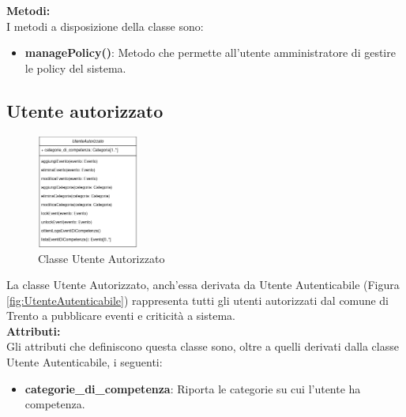 \textbf{Metodi:}\\
I metodi a disposizione della classe sono:

\begin{itemize}
    \item \textbf{managePolicy()}: Metodo che permette all'utente amministratore di gestire le policy del sistema.
\end{itemize}

\subsection{Utente autorizzato}

\begin{figure}[htbp]
    \centering
    \includegraphics[width=0.3\textwidth]{Images/UtenteAutorizzato-Class.png}
    \caption{Classe Utente Autorizzato}
    \label{fig:utente_autorizzato}
\end{figure}

La classe Utente Autorizzato, anch'essa derivata da Utente Autenticabile (Figura \ref{fig:UtenteAutenticabile}) rappresenta tutti gli utenti autorizzati dal comune di Trento a pubblicare eventi e criticità a sistema.\\

\textbf{Attributi:}\\
Gli attributi che definiscono questa classe sono, oltre a quelli derivati dalla classe Utente Autenticabile, i seguenti:
\begin{itemize}
    \item \textbf{categorie\_di\_competenza}: Riporta le categorie su cui l'utente ha competenza.\\
\end{itemize}

